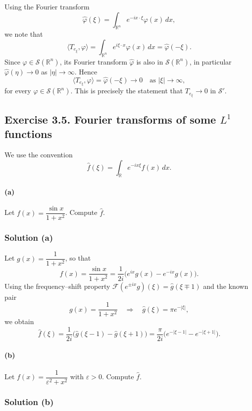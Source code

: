 \documentclass[12pt,a4paper]{article}
\theoremstyle{plain}
\theoremstyle{definition}
\theoremstyle{remark}
\theoremstyle{remark}
\begin{document}
Using the Fourier transform
\[
\widehat{\varphi}(\xi)
= \int_{\mathbb{R}^n} e^{-i x\cdot\xi}\varphi(x)\,dx,
\]
we note that
\[
\langle T_{e_\xi},\varphi\rangle
= \int_{\mathbb{R}^n} e^{i\xi\cdot x}\varphi(x)\,dx
= \widehat{\varphi}(-\xi).
\]
Since $\varphi\in\mathcal{S}(\mathbb{R}^n)$, its Fourier transform
$\widehat{\varphi}$ is also in $\mathcal{S}(\mathbb{R}^n)$, in
particular $\widehat{\varphi}(\eta)\to0$ as $|\eta|\to\infty$. Hence
\[
\langle T_{e_\xi},\varphi\rangle = \widehat{\varphi}(-\xi)\to0
\quad\text{as }|\xi|\to\infty,
\]
for every $\varphi\in\mathcal{S}(\mathbb{R}^n)$. This is precisely the
statement that $T_{e_\xi}\to0$ in $\mathcal{S}'$.


\subsection*{Exercise 3.5. Fourier transforms of some $L^1$ functions}

We use the convention
\[
\widehat{f}(\xi) = \int_{\mathbb{R}} e^{-i x\xi} f(x)\,dx.
\]

\paragraph{(a)}
Let $f(x)=\dfrac{\sin x}{1+x^2}$. Compute $\widehat{f}$.

\subsubsection*{Solution (a)}

Let $g(x)=\dfrac{1}{1+x^2}$, so that
\[
f(x) = \frac{\sin x}{1+x^2}
= \frac{1}{2i}\big(e^{ix}g(x) - e^{-ix}g(x)\big).
\]
Using the frequency--shift property
$\mathcal{F}(e^{\pm ix}g)(\xi) = \widehat{g}(\xi\mp 1)$ and the known
pair
\[
g(x)=\frac{1}{1+x^2}
\quad\Longrightarrow\quad
\widehat{g}(\xi) = \pi e^{-|\xi|},
\]
we obtain
\[
\widehat{f}(\xi)
= \frac{1}{2i}\big(\widehat{g}(\xi-1)-\widehat{g}(\xi+1)\big)
= \frac{\pi}{2i}\big(e^{-|\xi-1|}-e^{-|\xi+1|}\big).
\]

\paragraph{(b)}
Let $f(x)=\dfrac{1}{\varepsilon^2 + x^2}$ with $\varepsilon>0$. Compute
$\widehat{f}$.

\subsubsection*{Solution (b)}
\end{document}
